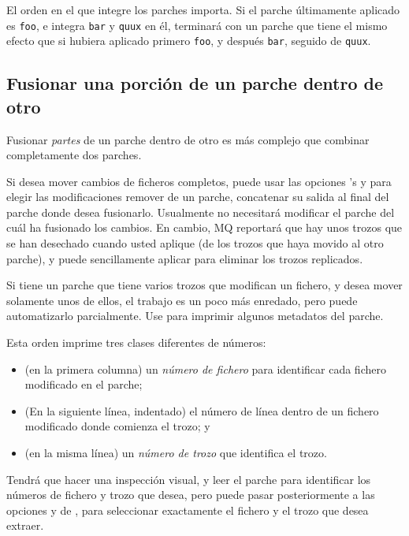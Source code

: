 El orden en el que integre los parches importa.  Si el parche
últimamente aplicado es \texttt{foo}, e integra  \texttt{bar} y
\texttt{quux} en él, terminará con un parche que tiene el mismo efecto
que si hubiera aplicado primero \texttt{foo}, y después \texttt{bar},
seguido de \texttt{quux}.

\subsection{Fusionar una porción de un parche dentro de otro}

Fusionar \emph{partes} de un parche dentro de otro es más complejo que
combinar completamente dos parches.

Si desea mover cambios de ficheros completos, puede usar las opciones
's  y
 para elegir las modificaciones remover de un
parche, concatenar su salida al final del parche donde desea
fusionarlo.  Usualmente no necesitará modificar el parche del cuál ha
fusionado los cambios.  En cambio, MQ reportará que hay unos trozos
que se han desechado cuando usted aplique  (de los
trozos que haya movido al otro parche), y puede sencillamente aplicar
 para eliminar los trozos replicados.

Si tiene un parche que tiene varios trozos que modifican un fichero, y
desea mover solamente unos de ellos, el trabajo es un poco más
enredado, pero puede automatizarlo parcialmente.  Use
 para imprimir algunos metadatos del parche.

Esta orden imprime tres clases diferentes de números:
\begin{itemize}
\item (en la primera columna) un \emph{número de fichero} para
  identificar cada fichero modificado en el parche;
\item (En la siguiente línea, indentado) el número de línea dentro de
  un fichero modificado donde comienza el trozo; y
\item (en la misma línea) un \emph{número de trozo} que identifica el
  trozo.
\end{itemize}

Tendrá que hacer una inspección visual, y leer el parche para
identificar los números de fichero y trozo que desea, pero puede pasar
posteriormente a las opciones  y 
 de , para seleccionar
exactamente el fichero y el trozo que desea extraer.

